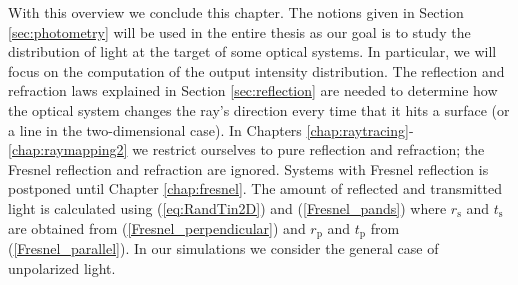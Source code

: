 With this overview we conclude this chapter. The notions given in Section \ref{sec:photometry} will be used in the entire thesis as our goal is to study the distribution of light at the target of some optical systems. In particular, we will focus on the computation of the output intensity distribution. The reflection and refraction laws explained in Section \ref{sec:reflection} are needed to determine how the optical system changes the ray's direction every time that it hits a surface (or a line in the two-dimensional case). In Chapters \ref{chap:raytracing}-\ref{chap:raymapping2} we restrict ourselves to pure reflection and refraction; the Fresnel reflection and refraction are ignored. Systems with Fresnel reflection is postponed until Chapter \ref{chap:fresnel}. The amount of reflected and transmitted light is calculated using (\ref{eq:RandTin2D}) and (\ref{Fresnel_pands}) where $r_\textrm{s}$ and $t_\textrm{s}$ are obtained from (\ref{Fresnel_perpendicular}) and $r_\textrm{p}$ and $t_\textrm{p}$ from (\ref{Fresnel_parallel}). In our simulations we consider the general case of unpolarized light. 
